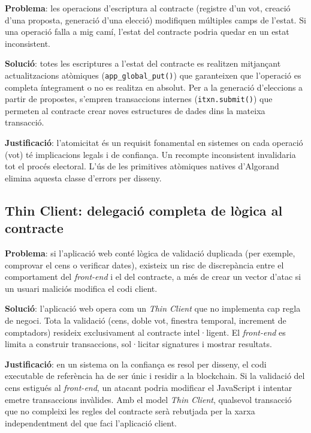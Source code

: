 \textbf{Problema}: les operacions d'escriptura al contracte (registre d'un vot, creació d'una proposta, generació d'una elecció) modifiquen múltiples camps de l'estat. Si una operació falla a mig camí, l'estat del contracte podria quedar en un estat inconsistent.

\textbf{Solució}: totes les escriptures a l'estat del contracte es realitzen mitjançant actualitzacions atòmiques (\texttt{app\_global\_put()}) que garanteixen que l'operació es completa íntegrament o no es realitza en absolut. Per a la generació d'eleccions a partir de propostes, s'empren transaccions internes (\texttt{itxn.submit()}) que permeten al contracte crear noves estructures de dades dins la mateixa transacció.

\textbf{Justificació}: l'atomicitat és un requisit fonamental en sistemes on cada operació (vot) té implicacions legals i de confiança. Un recompte inconsistent invalidaria tot el procés electoral. L'ús de les primitives atòmiques natives d'Algorand elimina aquesta classe d'errors per disseny.
 
\subsection{Thin Client: delegació completa de lògica al contracte}
 
\textbf{Problema}: si l'aplicació web conté lògica de validació duplicada (per exemple, comprovar el cens o verificar dates), existeix un risc de discrepància entre el comportament del \textit{front-end} i el del contracte, a més de crear un vector d'atac si un usuari maliciós modifica el codi client.
 
\textbf{Solució}: l'aplicació web opera com un \textit{Thin Client} que no implementa cap regla de negoci. Tota la validació (cens, doble vot, finestra temporal, increment de comptadors) resideix exclusivament al contracte intel·ligent. El \textit{front-end} es limita a construir transaccions, sol·licitar signatures i mostrar resultats.
 
\textbf{Justificació}: en un sistema on la confiança es resol per disseny, el codi executable de referència ha de ser únic i residir a la blockchain. Si la validació del cens estigués al \textit{front-end}, un atacant podria modificar el JavaScript i intentar emetre transaccions invàlides. Amb el model \textit{Thin Client}, qualsevol transacció que no compleixi les regles del contracte serà rebutjada per la xarxa independentment del que faci l'aplicació client.
 
